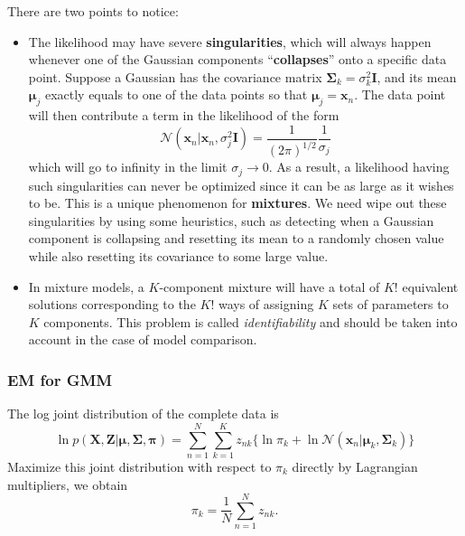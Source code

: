 \documentclass[a4paper]{book}
\renewcommand{\bf}{\mathbf}
\renewcommand{\cal}{\mathcal}
\newcommand{\imp}[1]{\textit{#1}}
\newcommand{\bs}{\boldsymbol}
\begin{document}
There are two points to notice:
\begin{itemize}
\item The likelihood may have severe \textbf{singularities}, which will always happen whenever one of the Gaussian components ``\textbf{collapses}'' onto a specific data point. Suppose a Gaussian has the covariance matrix $\bs{\Sigma}_k = \sigma_k^2 \bf{I}$, and its mean $\bs{\mu}_j$ exactly equals to one of the data points so that $\bs{\mu}_j = \bf{x}_n$. The data point will then contribute a term in the likelihood of the form
\begin{equation}
	\cal{N}(\bf{x}_n|\bf{x}_n,\sigma_j^2 \bf{I}) = \frac{1}{(2\pi)^{1/2}}\frac{1}{\sigma_j}
\end{equation}
which will go to infinity in the limit $\sigma_j \rightarrow 0$. As a result, a likelihood having such singularities can never be optimized since it can be as large as it wishes to be. This is a unique phenomenon for \textbf{mixtures}. We need wipe out these singularities by using some heuristics, such as detecting when a Gaussian component is collapsing and resetting its mean to a randomly chosen value while also resetting its covariance to some large value.
\item In mixture models, a $K$-component mixture will have a total of $K!$ equivalent solutions corresponding to the $K!$ ways of assigning $K$ sets of parameters to $K$ components. This problem is called \imp{identifiability} and should be taken into account in the case of model comparison.
\end{itemize}
\subsubsection{EM for GMM}
The log joint distribution of the complete data is 
\begin{equation}
	\ln p(\bf{X,Z}|\bs{\mu,\Sigma,\pi}) = \sum_{n=1}^N \sum_{k=1}^K z_{nk}\{ \ln \pi_k +\ln \cal{N}(\bf{x}_n|\bs{\mu}_k,\bs{\Sigma}_k)\}
\end{equation}
Maximize this joint distribution with respect to $\pi_k$ directly by Lagrangian multipliers, we obtain
\begin{equation}
	\pi_k = \frac{1}{N} \sum_{n=1}^N z_{nk}.
\end{equation}
\end{document}
